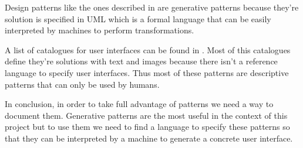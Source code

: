 Design patterns like the ones described in \cite{Design_Patterns} are generative patterns because they're solution is specified in UML which is a formal language that can be easily interpreted by machines to perform transformations.

A list of catalogues for user interfaces can be found in \cite{The_Interaction_Design_Patterns_Page}. Most of this catalogues define they're solutions with text and images because there isn't a reference language to specify user interfaces. Thus most of these patterns are descriptive patterns that can only be used by humans.

In conclusion, in order to take full advantage of patterns we need a way to document them. Generative patterns are the most useful in the context of this project but to use them we need to find a language to specify these patterns so that they can be interpreted by a machine to generate a concrete user interface.